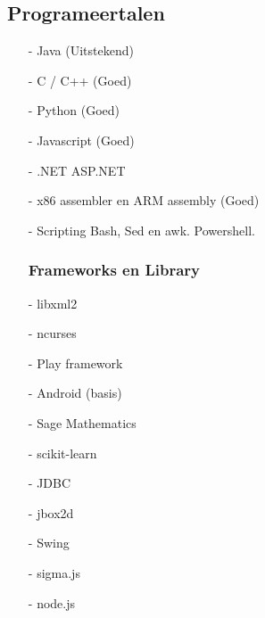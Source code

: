 \documentclass[margin, 10pt]{res} %
\begin{document}
\subsection{Programeertalen}
\begin{multicols}{2}
\begin{enumerate}
\item[-] Java (Uitstekend)
\item[-] C / C++ (Goed)
\item[-] Python (Goed)
\item[-] Javascript (Goed)

\item[-] .NET
\subitem ASP.NET
\item[-] x86 assembler en ARM assembly (Goed)
\item[-] Scripting
\subitem Bash, Sed en awk.
\subitem Powershell.
\subsubsection*{Frameworks en Library}
\item[-] libxml2
\item[-] ncurses
\item[-] Play framework
\item[-] Android (basis)
\item[-] Sage Mathematics
\item[-] scikit-learn
\item[-] JDBC
\item[-] jbox2d
\item[-] Swing
\item[-] sigma.js
\item[-] node.js
\end{enumerate}
\end{multicols}
\end{document}
